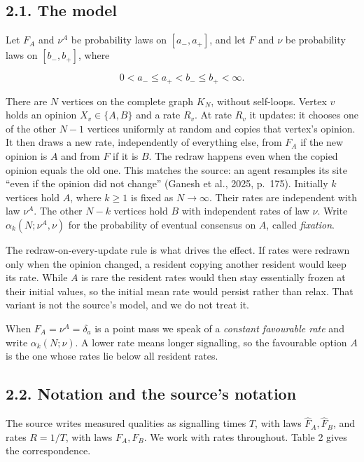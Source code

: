 \documentclass[
  british,
  11pt,
  a4paper,
]{article}
\begin{document}
\subsection{2.1. The model}\label{the-model}

Let \(F_A\) and \(\nu^A\) be probability laws on \([a_-,a_+]\), and let
\(F\) and \(\nu\) be probability laws on \([b_-,b_+]\), where

\[
0<a_-\le a_+<b_-\le b_+<\infty.
\tag{1}
\]

There are \(N\) vertices on the complete graph \(K_N\), without
self-loops. Vertex \(v\) holds an opinion \(X_v\in\{A,B\}\) and a rate
\(R_v\). At rate \(R_v\) it updates: it chooses one of the other \(N-1\)
vertices uniformly at random and copies that vertex's opinion. It then
draws a new rate, independently of everything else, from \(F_A\) if the
new opinion is \(A\) and from \(F\) if it is \(B\). The redraw happens
even when the copied opinion equals the old one. This matches the
source: an agent resamples its site ``even if the opinion did not
change'' (Ganesh et al., 2025, p.~175). Initially \(k\) vertices hold
\(A\), where \(k\ge1\) is fixed as \(N\to\infty\). Their rates are
independent with law \(\nu^A\). The other \(N-k\) vertices hold \(B\)
with independent rates of law \(\nu\). Write \(\alpha_k(N;\nu^A,\nu)\)
for the probability of eventual consensus on \(A\), called
\emph{fixation}.

The redraw-on-every-update rule is what drives the effect. If rates were
redrawn only when the opinion changed, a resident copying another
resident would keep its rate. While \(A\) is rare the resident rates
would then stay essentially frozen at their initial values, so the
initial mean rate would persist rather than relax. That variant is not
the source's model, and we do not treat it.

When \(F_A=\nu^A=\delta_a\) is a point mass we speak of a \emph{constant
favourable rate} and write \(\alpha_k(N;\nu)\). A lower rate means
longer signalling, so the favourable option \(A\) is the one whose rates
lie below all resident rates.

\subsection{2.2. Notation and the source's
notation}\label{notation-and-the-sources-notation}

The source writes measured qualities as signalling times \(T\), with
laws \(\hat F_A,\hat F_B\), and rates \(R=1/T\), with laws \(F_A,F_B\).
We work with rates throughout. Table 2 gives the correspondence.
\end{document}
